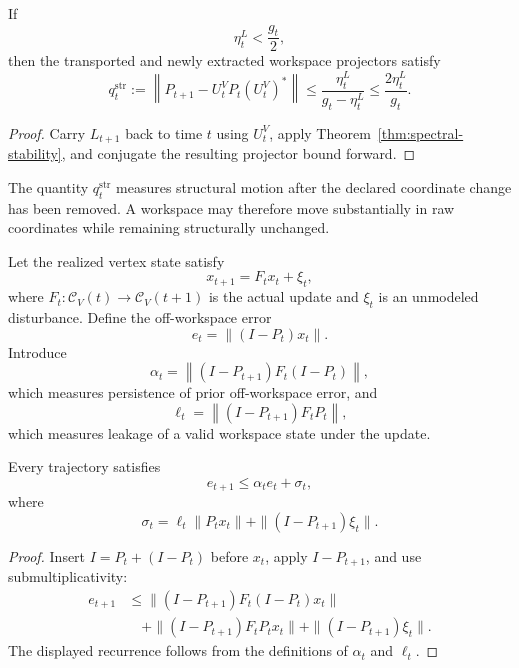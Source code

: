 \begin{corollary}\label{cor:temporal-workspace-tracking}
If
\[
\eta_t^L<\frac{g_t}{2},
\]
then the transported and newly extracted workspace projectors satisfy
\[
\boxed{
q_t^{\mathrm{str}}
:=
\left\|
P_{t+1}-U_t^VP_t(U_t^V)^*
\right\|
\leq
\frac{\eta_t^L}{g_t-\eta_t^L}
\leq
\frac{2\eta_t^L}{g_t}.
}
\]
\end{corollary}

\begin{proof}
Carry \(L_{t+1}\) back to time \(t\) using \(U_t^V\), apply
Theorem~\ref{thm:spectral-stability}, and conjugate the resulting projector
bound forward.
\end{proof}

The quantity \(q_t^{\mathrm{str}}\) measures structural motion after the
declared coordinate change has been removed. A workspace may therefore move
substantially in raw coordinates while remaining structurally unchanged.


Let the realized vertex state satisfy
\[
x_{t+1}=F_tx_t+\xi_t,
\]
where \(F_t:\mathcal C_V(t)\to\mathcal C_V(t+1)\) is the actual update and
\(\xi_t\) is an unmodeled disturbance. Define the off-workspace error
\[
\boxed{
e_t=\|(I-P_t)x_t\|.
}
\]
Introduce
\[
\alpha_t
=
\left\|
(I-P_{t+1})F_t(I-P_t)
\right\|,
\]
which measures persistence of prior off-workspace error, and
\[
\ell_t
=
\left\|
(I-P_{t+1})F_tP_t
\right\|,
\]
which measures leakage of a valid workspace state under the update.

\begin{proposition}\label{prop:grounded-coherence-recurrence}
Every trajectory satisfies
\[
\boxed{
e_{t+1}\leq\alpha_te_t+\sigma_t,}
\]
where
\[
\boxed{
\sigma_t
=
\ell_t\|P_tx_t\|
+
\|(I-P_{t+1})\xi_t\|.
}
\]
\end{proposition}

\begin{proof}
Insert \(I=P_t+(I-P_t)\) before \(x_t\), apply \(I-P_{t+1}\), and use
submultiplicativity:
\[
\begin{aligned}
e_{t+1}
&\leq
\|(I-P_{t+1})F_t(I-P_t)x_t\|\\
&\quad+
\|(I-P_{t+1})F_tP_tx_t\|
+
\|(I-P_{t+1})\xi_t\|.
\end{aligned}
\]
The displayed recurrence follows from the definitions of \(\alpha_t\) and
\(\ell_t\).
\end{proof}

